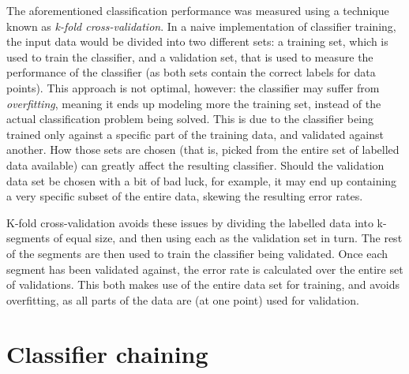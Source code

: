 \documentclass{netsec2012}
\begin{document}
\label{ref:crossvalidation}

The aforementioned classification performance was measured using a technique known as \emph{k-fold
cross-validation}.  In a naive implementation of classifier training, the input data would be
divided into two different sets: a training set, which is used to train the classifier, and a
validation set, that is used to measure the performance of the classifier (as both sets contain the
correct labels for data points).  This approach is not optimal, however: the classifier may suffer
from \emph{overfitting}, meaning it ends up modeling more the training set, instead of the actual
classification problem being solved.  This is due to the classifier being trained only against a
specific part of the training data, and validated against another.  How those sets are chosen (that
is, picked from the entire set of labelled data available) can greatly affect the resulting
classifier.  Should the validation data set be chosen with a bit of bad luck, for example, it may
end up containing a very specific subset of the entire data, skewing the resulting error rates.

K-fold cross-validation avoids these issues by dividing the labelled data into k-segments of equal
size, and then using each as the validation set in turn.  The rest of the segments are then used to
train the classifier being validated.  Once each segment has been validated against, the error rate
is calculated over the entire set of validations.  This both makes use of the entire data set for
training, and avoids overfitting, as all parts of the data are (at one point) used for validation.


\section{Classifier chaining}

\end{document}
